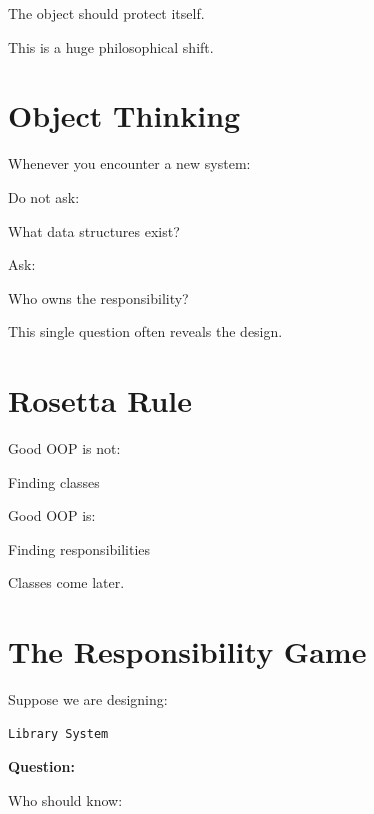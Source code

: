 \documentclass[11pt,a4paper]{book}
\begin{document}
The object should protect itself.

This is a huge philosophical shift.


\section{Object Thinking}

Whenever you encounter a new system:

Do not ask:

\begin{center}
What data structures exist?
\end{center}

Ask:

\begin{center}
Who owns the responsibility?
\end{center}

This single question often reveals the design.


\section{Rosetta Rule}

Good OOP is not:

\begin{center}
Finding classes
\end{center}

Good OOP is:

\begin{center}
Finding responsibilities
\end{center}

Classes come later.


\section{The Responsibility Game}

Suppose we are designing:

\begin{verbatim}
Library System
\end{verbatim}

\textbf{Question:}

Who should know:
\end{document}
